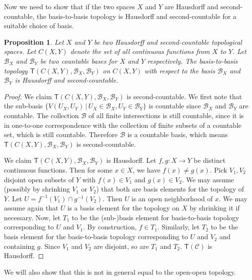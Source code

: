 \documentclass[review]{elsarticle}
\theoremstyle{plain}%
\newtheorem{prop}[thm]{Proposition}
\theoremstyle{definition}
\theoremstyle{remark}
\begin{document}
Now we need to show that if the two spaces $X$ and $Y$ are Hausdorff and second-countable, the basis-to-basis topology is Hausdorff and second-countable for a suitable choice of basis.

\begin{prop}
	Let $X$ and $Y$ be two Hausdorff and second-countable topological spaces. Let $C(X,Y)$ denote the set of all continuous functions from $X$ to $Y$. Let $\mathcal{B}_X$ and $\mathcal{B}_Y$ be two countable bases for $X$ and $Y$ respectively. The basis-to-basis topology $\mathsf{T}(C(X,Y), \mathcal{B}_X, \mathcal{B}_Y)$ on $C(X,Y)$ with respect to the basis $\mathcal{B}_X$ and $\mathcal{B}_Y$ is Hausdorff and second-countable. 
\end{prop}
\begin{proof}
	We claim $\mathsf{T}(C(X,Y), \mathcal{B}_X, \mathcal{B}_Y)$ is second-countable. We first note that the sub-basis $\{V(U_X, U_Y) \, |\,   U_X \in \mathcal{B}_X , U_Y \in \mathcal{B}_Y \}$ is countable since $\mathcal{B}_X$ and $\mathcal{B}_Y$ are countable. The collection $\mathcal{B}$ of all finite intersections is still countable, since it is in one-to-one correspondence with the collection of finite subsets of a countable set, which is still countable. Therefore $\mathcal{B}$ is a countable basis, which means $\mathsf{T}(C(X,Y), \mathcal{B}_X, \mathcal{B}_Y)$ is second-countable.
	
	We claim $\mathsf{T}(C(X,Y), \mathcal{B}_X, \mathcal{B}_Y)$ is Hausdorff. Let $f,g:X\to Y$ be distinct continuous functions. Then for some $x\in X$, we have $f(x)\neq g(x)$. Pick $V_1, V_2$ disjoint open subsets of $Y$ with $f(x)\in V_1$ and $g(x)\in V_2$. We may assume (possibly by shrinking $V_1$ or $V_2$) that both are basis elements for the topology of $Y$. Let $U=f^{-1}(V_1)\cap g^{-1}(V_2)$. Then $U$ is an open neighborhood of $x$. We may assume again that $U$ is a basis element for the topology on $X$ by shrinking it if necessary. Now, let $T_1$ to be the (sub-)basis element for basis-to-basis topology corresponding to $U$ and $V_1$. By construction, $f\in T_1$. Similarly, let $T_2$ to be the basis element for the basis-to-basis topology corresponding to $U$ and $V_2$ and containing $g$. Since $V_1$ and $V_2$ are disjoint, so are $T_1$ and $T_2$. $\mathsf{T}(\mathcal{C})$ is Hausdorff.
\end{proof}

We will also show that this is not in general equal to the open-open topology. 
\end{document}
